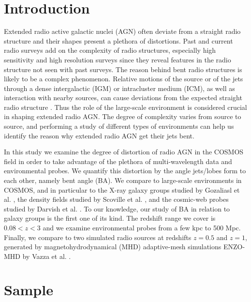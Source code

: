 \documentclass[galaxies,article,submit,moreauthors,pdftex]{Definitions/mdpi}
\begin{document}


\section{Introduction}

Extended radio active galactic nuclei (AGN) often deviate from a straight radio structure and their shapes present a plethora of distortions. Past and current radio surveys add on the complexity of radio structures, especially high sensitivity and high resolution surveys since they reveal features in the radio structure not seen with past surveys. The reason behind bent radio structures is likely to be a complex phenomenon. Relative motions of the source or of the jets through a dense intergalactic (IGM) or intracluster medium (ICM), as well as interaction with nearby sources, can cause deviations from the expected straight radio structure \citep[e.g.][]{smolcic07, garon19}. Thus the role of the large-scale environment is considered crucial in shaping extended radio AGN. The degree of complexity varies from source to source, and performing a study of different types of environments can help us identify the reason why extended radio AGN get their jets bent. 

 

In this study we examine the degree of distortion of radio AGN in the COSMOS field \citep{scoville07} in order to take advantage of the plethora of multi-wavelength data and environmental probes. We quantify this distortion by the angle jets/lobes form to each other, namely bent angle (BA). We compare to large-scale environments in COSMOS, and in particular to the X-ray galaxy groups studied by Gozaliasl et al. \citep{gozaliasl19}, the density fields studied by Scoville et al. \citep{scoville13}, and the cosmic-web probes studied by Darvish et al. \cite{darvish15, darvish17}. To our knowledge, our study of BA in relation to galaxy groups is the first one of its kind. The redshift range we cover is $0.08 < z < 3$ and we examine environmental probes from a few kpc to 500 Mpc. Finally, we compare to two simulated radio sources at redshifts $z = 0.5$ and $z = 1$, generated by  magnetohydrodynamical  (MHD) adaptive-mesh simulations ENZO-MHD by Vazza et al. \citep{vazza21}.
 
\section{Sample}
\label{sec:sample}
\end{document}
